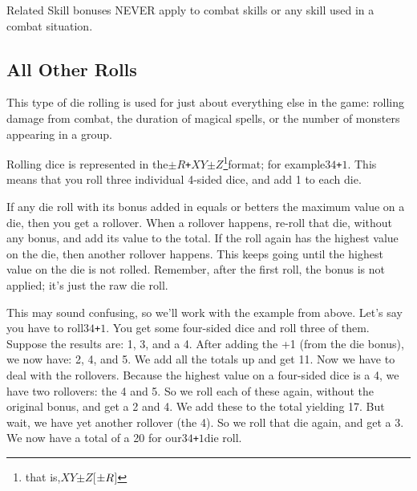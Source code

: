 \documentclass[twoside]{book}
\begin{document}
  
    {  
    Related Skill bonuses NEVER apply to combat skills or any skill used in a combat situation.
    }
  
    

\subsection{All Other Rolls}
    
    {  
    This type of die rolling is used for just about everything else in the game: rolling damage from combat, the duration of magical spells, or the number of monsters appearing in a group.
    }
  
    {  
    Rolling dice is represented in the\texttt{\ensuremath{\pm}}\ensuremath{R}\texttt{+}\ensuremath{X}\ensuremath{Y}\texttt{\ensuremath{\pm}}\ensuremath{Z}\footnote{that is,\ensuremath{X}\ensuremath{Y}\texttt{\ensuremath{\pm}}\ensuremath{Z}[\ensuremath{\texttt{\ensuremath{\pm}}\ensuremath{R}}]}format; for example\ensuremath{3}\ensuremath{4}\texttt{+}\ensuremath{1}. This means that you roll three individual 4-sided dice, and add 1 to each die.
    }
  
    {  
    If any die roll with its bonus added in equals or betters the maximum value on a die, then you get a rollover. When a rollover happens, re-roll that die, without any bonus, and add its value to the total. If the roll again has the highest value on the die, then another rollover happens. This keeps going until the highest value on the die is not rolled. Remember, after the first roll, the bonus is not applied; it's just the raw die roll.
    }
  
    {  
    This may sound confusing, so we'll work with the example from above. Let's say you have to roll\ensuremath{3}\ensuremath{4}\texttt{+}\ensuremath{1}. You get some four-sided dice and roll three of them. Suppose the results are: 1, 3, and a 4. After adding the +1 (from the die bonus), we now have: 2, 4, and 5. We add all the totals up and get 11. Now we have to deal with the rollovers. Because the highest value on a four-sided dice is a 4, we have two rollovers: the 4 and 5. So we roll each of these again, without the original bonus, and get a 2 and 4. We add these to the total yielding 17. But wait, we have yet another rollover (the 4). So we roll that die again, and get a 3. We now have a total of a 20 for our\ensuremath{3}\ensuremath{4}\texttt{+}\ensuremath{1}die roll.
    }
  
\end{document}
